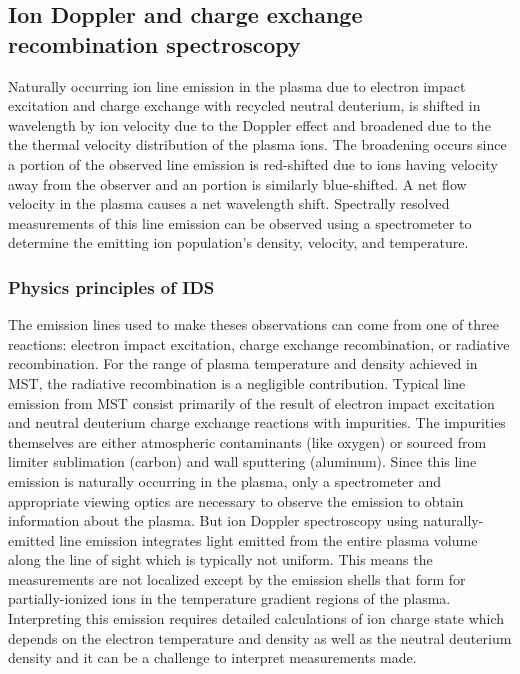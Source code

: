 \subsection{Ion Doppler and charge exchange recombination spectroscopy}\label{sec:ids}

Naturally occurring ion line emission in the plasma due to electron impact excitation and charge exchange with recycled neutral deuterium, is shifted in wavelength by ion velocity due to the Doppler effect and broadened due to the the thermal velocity distribution of the plasma ions. The broadening occurs since a portion of the observed line emission is red-shifted due to ions having velocity away from the observer and an portion is similarly blue-shifted. A net flow velocity in the plasma causes a net wavelength shift. Spectrally resolved measurements of this line emission can be observed using a spectrometer to determine the emitting ion population's density, velocity, and temperature.

\subsubsection{Physics principles of IDS}
The emission lines used to make theses observations can come from one of three reactions: electron impact excitation, charge exchange recombination, or radiative recombination. For the range of plasma temperature and density achieved in MST, %
the radiative recombination is a negligible contribution. Typical line emission from MST consist primarily of the result of electron impact excitation and neutral deuterium charge exchange reactions with impurities. The impurities themselves are either atmospheric contaminants (like oxygen) or sourced from limiter sublimation (carbon) and wall sputtering (aluminum). Since this line emission is naturally occurring in the plasma, only a spectrometer and appropriate viewing optics are necessary to observe the emission to obtain information about the plasma. But ion Doppler spectroscopy using naturally-emitted line emission integrates light emitted from the entire plasma volume along the line of sight which is typically not uniform. This means the measurements are not localized except by the emission shells that form for partially-ionized ions in the temperature gradient regions of the plasma. Interpreting this emission requires detailed calculations of ion charge state which depends on the electron temperature and density as well as the neutral deuterium density and it can be a challenge to interpret measurements made. 

